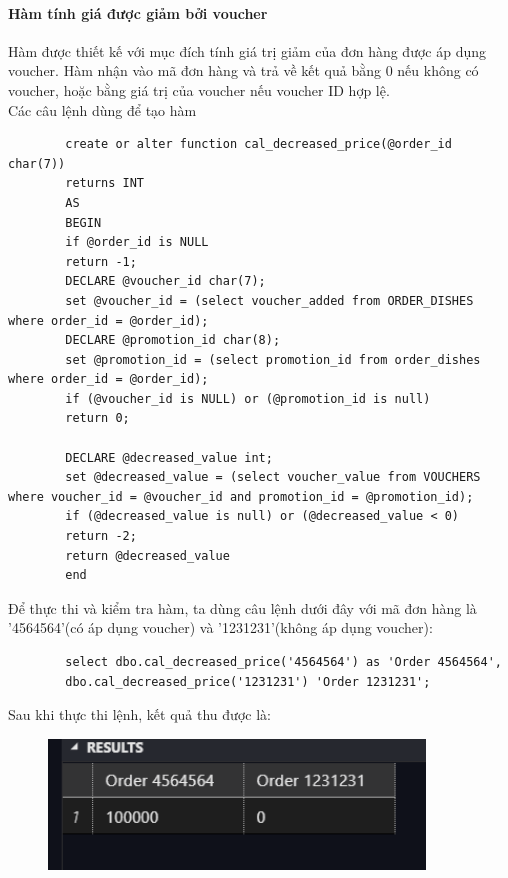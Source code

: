 \documentclass[13pt,a4paper]{article}
\begin{document}
	\paragraph{Hàm tính giá được giảm bởi voucher\\}
	Hàm được thiết kế với mục đích tính giá trị giảm của đơn hàng được áp dụng voucher. Hàm nhận vào mã đơn hàng và trả về kết quả bằng 0 nếu không có voucher, hoặc bằng giá trị của voucher nếu  voucher ID hợp lệ. \\
	Các câu lệnh dùng để tạo hàm
	\begin{lstlisting}
		create or alter function cal_decreased_price(@order_id char(7))
		returns INT
		AS
		BEGIN
		if @order_id is NULL
		return -1;
		DECLARE @voucher_id char(7);
		set @voucher_id = (select voucher_added	from ORDER_DISHES where order_id = @order_id);
		DECLARE @promotion_id char(8);
		set @promotion_id = (select promotion_id from order_dishes where order_id = @order_id);
		if (@voucher_id is NULL) or (@promotion_id is null)
		return 0;
		
		DECLARE @decreased_value int;
		set @decreased_value = (select voucher_value from VOUCHERS where voucher_id = @voucher_id and promotion_id = @promotion_id);
		if (@decreased_value is null) or (@decreased_value < 0)
		return -2;
		return @decreased_value
		end
	\end{lstlisting}
	Để thực thi và kiểm tra hàm, ta dùng câu lệnh dưới đây với mã đơn hàng là '4564564'(có áp dụng voucher) và '1231231'(không áp dụng voucher):
	\begin{lstlisting}
		select dbo.cal_decreased_price('4564564') as 'Order 4564564',
		dbo.cal_decreased_price('1231231') 'Order 1231231';
	\end{lstlisting}
	Sau khi thực thi lệnh, kết quả thu được là:
	\begin{figure}[h!]
		\begin{center}
			\includegraphics[width=10cm]{vitran/f_dp.png}
		\end{center}
	\end{figure}
	
\end{document}
